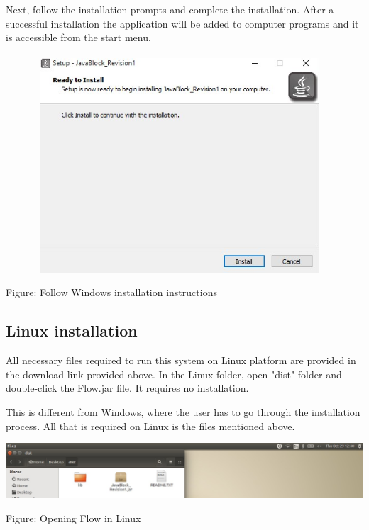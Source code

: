 \documentclass[11pt,a4paper,titlepage]{article}
\begin{document}
		Next, follow the installation prompts and complete the installation. After a successful installation the application will be added to computer programs and it is accessible from the start menu. \\ \\
		
		\includegraphics[width=13cm,height=8cm]{images/Install2.jpg}		
		\begin{center}
		Figure: Follow Windows installation instructions
		\end{center}
		
		\subsection{Linux installation}
		
		All necessary files required to run this system on Linux platform are provided in the download link provided above. In the Linux folder, open "dist" folder and double-click the Flow.jar file. It requires no installation.\newline 
		
		This is different from Windows, where the user has to go through the installation process. All that is required on Linux is the files mentioned above.\newline \newline
		
		\includegraphics[width=14cm]{images/linuxInstall.jpg}		
		\begin{center}
			Figure: Opening Flow in Linux \newline
		\end{center}
		
\end{document}
